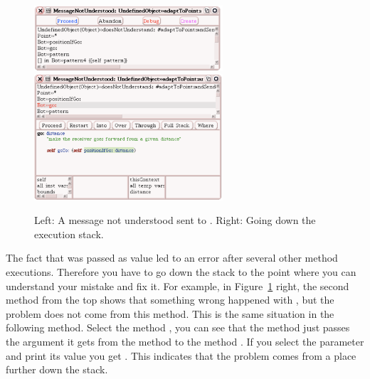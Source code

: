 \begin{figure}[h]
\centerline{\includegraphics[width=7cm]{8DebugAnotherError}\includegraphics[width=7cm]{8bDebugAnotherError}}
\caption{Left: A message not understood sent to . Right: Going down the execution stack. \label{fig:8DebugAnotherError}}
\end{figure}

The fact that  was passed as value led to an error after several other method executions. Therefore you have to go down the stack to the point where you can understand your mistake and fix it. For example, in Figure~\ref{fig:8DebugAnotherError} right, the second method from the top shows that something wrong happened with \ct{*}, but the problem does not come from this method. This is the same situation in the following method. Select the method , you can see that the method  just passes the argument it gets from the method  to the method . If you select the parameter  and print its value you get . This indicates 
that the problem comes from a place further down the stack. 

